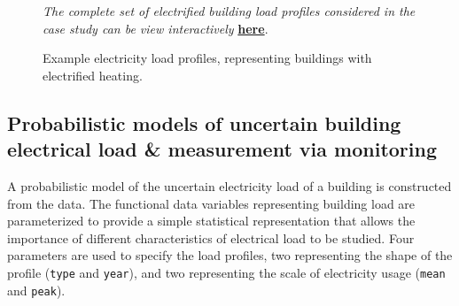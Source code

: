 \begin{figure}[b!]
    \centering

    \vspace*{-0.2cm}
    \caption{Example electricity load profiles, representing buildings with electrified heating.} \label{fig:districts-example-load-data}
    \vspace{0.1cm}
    \small{\textit{The complete set of electrified building load profiles considered in the case study can be view interactively} \href{https://mal84emma.github.io/Building-Design-VoI/load_dataset_plot.html}{\textbf{here}}.}
\end{figure}


\subsection{Probabilistic models of uncertain building electrical load \& measurement via monitoring} \label{sec:districts-prob}


A probabilistic model of the uncertain electricity load of a building is constructed from the data. The functional data variables representing building load are parameterized to provide a simple statistical representation that allows the importance of different characteristics of electrical load to be studied. Four parameters are used to specify the load profiles, two representing the shape of the profile (\texttt{type} and \texttt{year}), and two representing the scale of electricity usage (\texttt{mean} and \texttt{peak}).

